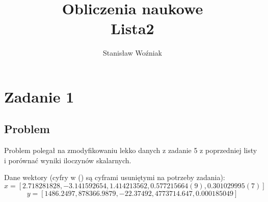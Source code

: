 \documentclass{article}
\title{Obliczenia naukowe\\Lista2}
\author{Stanisław Woźniak}
\date{}
\begin{document}
\maketitle
\section{Zadanie 1}
\subsection{Problem}
Problem polegał na zmodyfikowaniu lekko danych z zadanie 5 z poprzedniej listy i porównać wyniki iloczynów skalarnych.

Dane wektory (cyfry w () są cyframi usuniętymi na potrzeby zadania):
\[x = [2.718281828, -3.141592654, 1.414213562, 0.577215664(9), 0.301029995(7)]\]
\[y = [1486.2497, 878366.9879, -22.37492, 4773714.647, 0.000185049]\]
\end{document}
